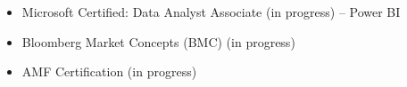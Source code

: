 \begin{itemize}
    \item Microsoft Certified: Data Analyst Associate (in progress) – Power BI
    \item Bloomberg Market Concepts (BMC) (in progress)
    \item AMF Certification (in progress)
\end{itemize}
